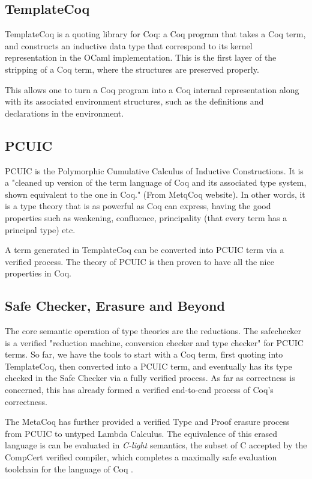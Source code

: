 \subsection{TemplateCoq}
\label{sec:mc-template}

TemplateCoq is a quoting library for Coq: a Coq program that takes a Coq term,
and constructs an inductive data type that correspond to its kernel
representation in the OCaml implementation. This is the first layer of the
stripping of a Coq term, where the structures are preserved properly.


This allows one to turn a Coq program into a Coq internal representation along
with its associated environment structures, such as the definitions and
declarations in the environment.

\subsection{PCUIC}
\label{sec:mc-pcuic}

PCUIC is the Polymorphic Cumulative Calculus of Inductive Constructions. It is a
"cleaned up version of the term language of Coq and its associated type system,
shown equivalent to the one in Coq." (From MetqCoq website). In other words, it 
is a type theory that is as powerful as Coq can express, having the good
properties such as weakening, confluence, principality (that every term has a
principal type) etc.

A term generated in TemplateCoq can be converted into PCUIC term via a verified
process. The theory of PCUIC is then proven to have all the nice properties in
Coq.


\subsection{Safe Checker, Erasure and Beyond}
\label{sec:mc-beyond}

The core semantic operation of type theories are the reductions. The safechecker
is a verified "reduction machine, conversion checker and type checker" for PCUIC
terms. So far, we have the tools to start with a Coq term, first quoting into
TemplateCoq, then converted into a PCUIC term, and eventually has its type
checked in the Safe Checker via a fully verified process. As far as correctness
is concerned, this has already formed a verified end-to-end process of Coq's 
correctness.

The MetaCoq has further provided a verified Type and Proof erasure process from
PCUIC to untyped Lambda Calculus. The equivalence of this erased language is
can be evaluated in \emph{C-light} semantics, the subset of C accepted by
the CompCert verified compiler, which completes a maximally safe evaluation
toolchain for the language of Coq .
